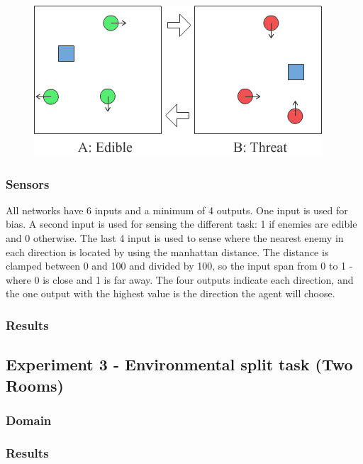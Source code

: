 \documentclass[11pt, a4paper]{article}
\begin{document}
\begin{figure}[!ht]
\centering
\includegraphics[scale=0.5]{PreyPredatorDomain}
\caption{}
\end{figure}
\subsubsection{Sensors}
All networks have 6 inputs and a minimum of 4 outputs. One input is used for bias. A second input is used for sensing the different task: 1 if enemies are edible and 0 otherwise. The last 4 input is used to sense where the nearest enemy in each direction is located by using the manhattan distance. The distance is clamped between 0 and 100 and divided by 100, so the input span from 0 to 1 - where 0 is close and 1 is far away. The four outputs indicate each direction, and the one output with the highest value is the direction the agent will choose.
\subsubsection{Results}
\subsection{Experiment 3 - Environmental split task (Two Rooms)}
\subsubsection{Domain}
\subsubsection{Results}
\end{document}
